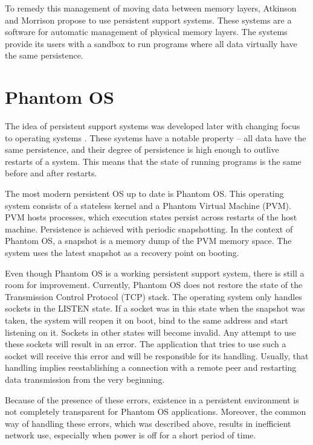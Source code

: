 To remedy this management of moving data between memory layers, Atkinson and
Morrison \cite{atkinson1995orthogonally} propose to use persistent support
systems. These systems are a software for automatic management of physical
memory layers. The systems provide its users with a sandbox to run programs
where all data virtually have the same persistence.

\section{Phantom OS}
\label{sec:int:phantom}

The idea of persistent support systems was developed later with changing focus
to operating systems
\cite{landau1992checkpoint,dearle1994grasshopper,atkinson2000review}. These
systems have a notable property -- all data have the same persistence, and
their degree of persistence is high enough to outlive restarts of a system.
This means that the state of running programs is the same before and after
restarts.

The most modern persistent OS up to date is Phantom OS. This operating system
consists of a stateless kernel and a Phantom Virtual Machine (PVM). PVM hosts
processes, which execution states persist across restarts of the host machine.
Persistence is achieved with periodic snapshotting. In the context of Phantom
OS, a snapshot is a memory dump of the PVM memory space. The system uses the
latest snapshot as a recovery point on booting.

Even though Phantom OS is a working persistent support system, there is still a
room for improvement. Currently, Phantom OS does not restore the state of the
Transmission Control Protocol (TCP) stack. The operating system only handles
sockets in the LISTEN state. If a socket was in this state when the snapshot
was taken, the system will reopen it on boot, bind to the same address and
start listening on it. Sockets in other states will become invalid. Any
attempt to use these sockets will result in an error. The application that
tries to use such a socket will receive this error and will be responsible for
its handling. Usually, that handling implies reestablishing a connection with a
remote peer and restarting data transmission from the very beginning.

Because of the presence of these errors, existence in a persistent environment
is not completely transparent for Phantom OS applications. Moreover, the common
way of handling these errors, which was described above, results in inefficient
network use, especially when power is off for a short period of time.

